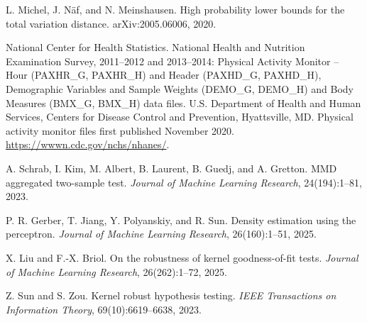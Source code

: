 

L. Michel, J. N{\"a}f, and N. Meinshausen.
\newblock High probability lower bounds for the total variation distance.
\newblock arXiv:2005.06006, 2020.

National Center for Health Statistics.
\newblock National Health and Nutrition Examination Survey, 2011--2012 and 2013--2014: Physical Activity Monitor -- Hour (PAXHR\_G, PAXHR\_H) and Header (PAXHD\_G, PAXHD\_H), Demographic Variables and Sample Weights (DEMO\_G, DEMO\_H) and Body Measures (BMX\_G, BMX\_H) data files.
\newblock U.S. Department of Health and Human Services, Centers for Disease Control and Prevention, Hyattsville, MD. Physical activity monitor files first published November 2020. \url{https://wwwn.cdc.gov/nchs/nhanes/}.

A. Schrab, I. Kim, M. Albert, B. Laurent, B. Guedj, and A. Gretton.
\newblock MMD aggregated two-sample test.
\newblock \emph{Journal of Machine Learning Research}, 24(194):1--81, 2023.

P. R. Gerber, T. Jiang, Y. Polyanskiy, and R. Sun.
\newblock Density estimation using the perceptron.
\newblock \emph{Journal of Machine Learning Research}, 26(160):1--51, 2025.

X. Liu and F.-X. Briol.
\newblock On the robustness of kernel goodness-of-fit tests.
\newblock \emph{Journal of Machine Learning Research}, 26(262):1--72, 2025.

Z. Sun and S. Zou.
\newblock Kernel robust hypothesis testing.
\newblock \emph{IEEE Transactions on Information Theory}, 69(10):6619--6638, 2023.

